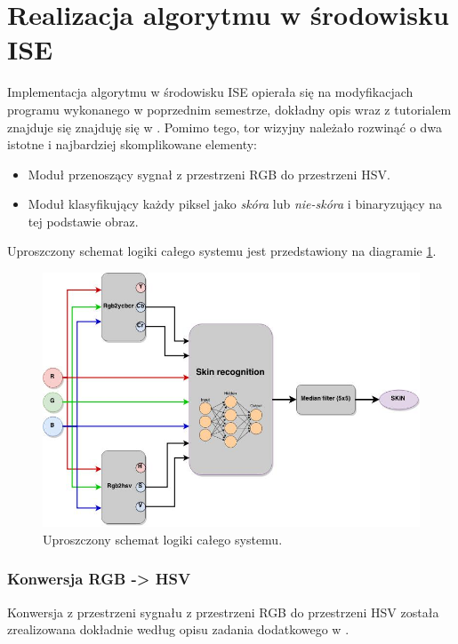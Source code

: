 \section{Realizacja algorytmu w środowisku ISE}

Implementacja algorytmu w środowisku ISE opierała się na modyfikacjach programu wykonanego w poprzednim semestrze, dokładny opis wraz z tutorialem znajduje się znajduję się w \cite{skryptFPGA}. Pomimo tego, tor wizyjny należało rozwinąć o dwa istotne i najbardziej skomplikowane elementy: 

\begin{itemize}
\item Moduł przenoszący sygnał z przestrzeni RGB do przestrzeni HSV.
\item Moduł klasyfikujący każdy piksel jako \textit{skóra} lub \textit{nie-skóra} i binaryzujący na tej podstawie obraz.
\end{itemize}


Uproszczony schemat logiki całego systemu jest przedstawiony na diagramie \ref{fig:schema1}. 

\begin{figure}[tbph!]
	\centering
	\includegraphics[width=1.1\linewidth]{images/schema1.jpg}
	\caption{Uproszczony schemat logiki całego systemu.}
	\label{fig:schema1}
\end{figure}

\subsubsection{Konwersja RGB -> HSV}

Konwersja z przestrzeni sygnału z przestrzeni RGB do przestrzeni HSV została zrealizowana dokładnie według opisu zadania dodatkowego w \cite{skryptFPGA}.


